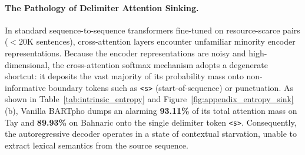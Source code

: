 \documentclass[11pt]{article}
\begin{document}
\begin{table}[!ht]
\centering\small
\caption{\textbf{Cross-Attention Intrinsic Probing Statistics Across Evaluated Language Pairs.} Demonstrating that TSSA resolves entropy dispersion and collapses delimiter sink mass.}
\label{tab:intrinsic_entropy}
\vspace{4pt}
\end{table}

\paragraph{The Pathology of Delimiter Attention Sinking.}
In standard sequence-to-sequence transformers fine-tuned on resource-scarce pairs ($<20\text{K}$ sentences), cross-attention layers encounter unfamiliar minority encoder representations. Because the encoder representations are noisy and high-dimensional, the cross-attention softmax mechanism adopts a degenerate shortcut: it deposits the vast majority of its probability mass onto non-informative boundary tokens such as \texttt{<s>} (start-of-sequence) or punctuation. As shown in Table~\ref{tab:intrinsic_entropy} and Figure~\ref{fig:appendix_entropy_sink}(b), Vanilla BARTpho dumps an alarming \textbf{93.11\%} of its total attention mass on Tay and \textbf{89.93\%} on Bahnaric onto the single delimiter token \texttt{<s>}. Consequently, the autoregressive decoder operates in a state of contextual starvation, unable to extract lexical semantics from the source sequence.
\end{document}

